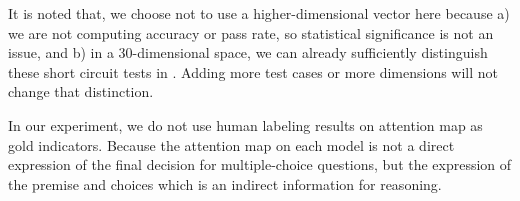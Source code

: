 It is noted that, we choose not to use a higher-dimensional vector
here because a) we are not computing accuracy or
pass rate, so statistical significance
is not an issue, and b) in a 30-dimensional space,
we can already sufficiently distinguish these short
circuit tests in . Adding more test cases
or more dimensions will not change that distinction.

In our experiment, we do not use human labeling results on attention map 
as gold indicators.  Because the attention map on each model is not a direct 
expression of the final decision for multiple-choice questions, 
but the expression of the premise and choices which is an indirect information for reasoning.








